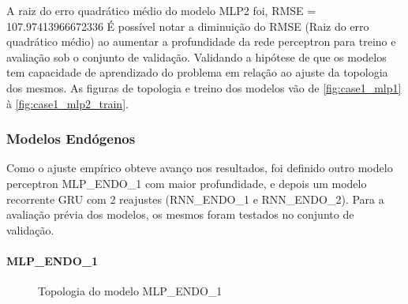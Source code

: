 \documentclass[	12pt, Times, openright, twoside, a4paper, english, brazil]{abntex2}
\begin{document}
                 A raiz do erro quadrático médio do modelo MLP2 foi, RMSE = 107.97413966672336
    	        É possível notar a diminuição do RMSE (Raiz do erro quadrático médio) ao aumentar a profundidade da rede perceptron para treino e avaliação sob o conjunto de validação. Validando a hipótese de que os modelos tem capacidade de aprendizado do problema em relação ao ajuste da topologia dos mesmos.
    	        As figuras de topologia e treino dos modelos vão de \ref{fig:case1_mlp1} à \ref{fig:case1_mlp2_train}.
          \subsubsection{Modelos Endógenos}
    	        Como o ajuste empírico obteve avanço nos resultados, foi definido outro modelo perceptron MLP\_ENDO\_1 com maior profundidade, e depois um modelo recorrente GRU com 2 reajustes (RNN\_ENDO\_1 e RNN\_ENDO\_2).
                Para a avaliação prévia dos modelos, os mesmos foram testados no conjunto de validação.
              \paragraph{MLP\_ENDO\_1}
      	        \begin{figure}[!ht]
                	\caption{Topologia do modelo MLP\_ENDO\_1 \label{fig:case1_mlp_endo1} }
                \end{figure}
\end{document}
